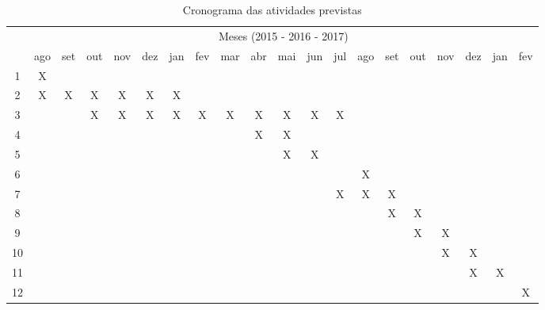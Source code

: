 \begin{table}[!htpb]
  \centering
  \begin{small}
    \setlength{\tabcolsep}{4pt}
    \begin{tabular}{|c|c|c|c|c|c|c|c|c|c|c|c|c|c|c|c|c|c|c|c|}\hline
      & \multicolumn{19}{c|}{Meses (2015 - 2016 - 2017)}\\ \cline{2-20}
      \raisebox{1.5ex}{Etapa} & ago & set & out & nov & dez & jan & fev & mar & abr & mai & jun & jul & ago & set & out & nov & dez & jan & fev \\ \hline
      1 & X &   &   &   &   &   &   &   &   &   &   &   &   &   &   &   &   &  &  \\ \hline
      2 & X & X & X & X & X & X &   &   &   &   &   &   &   &   &   &   &   &  &  \\ \hline
      3 &   &   & X & X & X & X & X & X & X & X & X & X &   &   &   &   &   &  &  \\ \hline
      4 &   &   &   &   &   &   &   &   & X & X &   &   &   &   &   &   &   &  &  \\ \hline
      5 &   &   &   &   &   &   &   &   &   & X & X &   &   &   &   &   &   &  &  \\ \hline
      6 &   &   &   &   &   &   &   &   &   &   &   &   & X &   &   &   &   &  &  \\ \hline
      7 &   &   &   &   &   &   &   &   &   &   &   & X & X & X &   &   &   &  &  \\ \hline
      8 &   &   &   &   &   &   &   &   &   &   &   &   &   & X & X &   &   &  &  \\ \hline
      9 &   &   &   &   &   &   &   &   &   &   &   &   &   &   & X & X &   &  &  \\ \hline
      10 &  &   &   &   &   &   &   &   &   &   &   &   &   &   &   & X & X &  &  \\ \hline
      11 &  &   &   &   &   &   &   &   &   &   &   &   &   &   &   &   & X & X &  \\ \hline
      12 &  &   &   &   &   &   &   &   &   &   &   &   &   &   &   &   &   &  & X \\ \hline
    \end{tabular}
  \end{small}
  \caption{Cronograma das atividades previstas}
  \label{t_cronograma}
\end{table}

